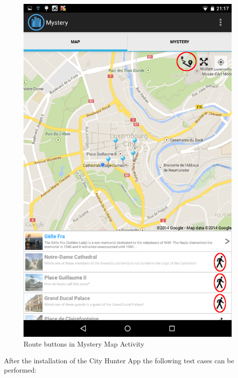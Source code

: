 \begin{figure}[H]
	\centering
	\includegraphics[scale=0.1]{Figures/RouteButtons}
	\caption{Route buttons in Mystery Map Activity}
	\label{fig:routeButtons}
\end{figure}

After the installation of the City Hunter App the following test cases can be performed:

